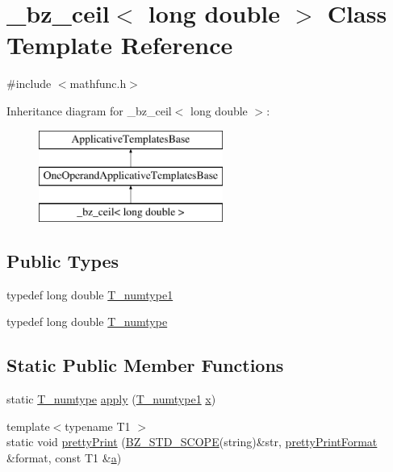 \hypertarget{class__bz__ceil_3_01long_01double_01_4}{}\section{\+\_\+bz\+\_\+ceil$<$ long double $>$ Class Template Reference}
\label{class__bz__ceil_3_01long_01double_01_4}


{\ttfamily \#include $<$mathfunc.\+h$>$}

Inheritance diagram for \+\_\+bz\+\_\+ceil$<$ long double $>$\+:\begin{figure}[H]
\begin{center}
\leavevmode
\includegraphics[height=3.000000cm]{class__bz__ceil_3_01long_01double_01_4}
\end{center}
\end{figure}
\subsection*{Public Types}
\begin{DoxyCompactItemize}
\item 
typedef long double \hyperlink{class__bz__ceil_3_01long_01double_01_4_a4804a29325d87435c7249d46dd39021a}{T\+\_\+numtype1}
\item 
typedef long double \hyperlink{class__bz__ceil_3_01long_01double_01_4_abfd987730be43acda9d1c75f88ce654a}{T\+\_\+numtype}
\end{DoxyCompactItemize}
\subsection*{Static Public Member Functions}
\begin{DoxyCompactItemize}
\item 
static \hyperlink{class__bz__ceil_3_01long_01double_01_4_abfd987730be43acda9d1c75f88ce654a}{T\+\_\+numtype} \hyperlink{class__bz__ceil_3_01long_01double_01_4_a10417eebcdb04046bd3a069069427bd2}{apply} (\hyperlink{class__bz__ceil_3_01long_01double_01_4_a4804a29325d87435c7249d46dd39021a}{T\+\_\+numtype1} \hyperlink{vecnorm1_8cc_ac73eed9e41ec09d58f112f06c2d6cb63}{x})
\item 
{\footnotesize template$<$typename T1 $>$ }\\static void \hyperlink{class__bz__ceil_3_01long_01double_01_4_ada3371cc815136ea350de429445ead9e}{pretty\+Print} (\hyperlink{numinquire_8h_a2b24ffc3b4ef9803956bc7715c6c7b83}{B\+Z\+\_\+\+S\+T\+D\+\_\+\+S\+C\+O\+P\+E}(string)\&str, \hyperlink{classprettyPrintFormat}{pretty\+Print\+Format} \&format, const T1 \&\hyperlink{gen__mat5files_8m_aae328bf20413f220e38aec4d95bfd6da}{a})
\end{DoxyCompactItemize}



